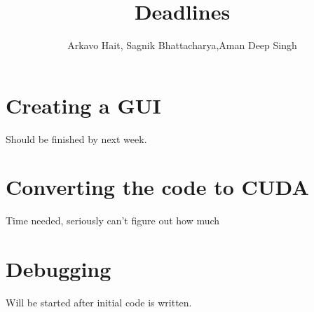 \documentclass{article}
\title{Deadlines}
\author{Arkavo Hait, Sagnik Bhattacharya,Aman Deep Singh}
\begin{document}
  \maketitle
  \section*{Creating a GUI}
  Should be finished by next week.
  \section*{Converting the code to CUDA}
  Time needed, seriously can't figure out how much
  \section*{Debugging}
  Will be started after initial code is written.
\end{document}
